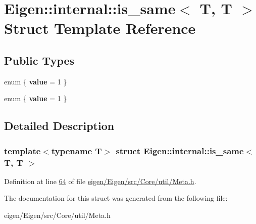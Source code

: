 \hypertarget{struct_eigen_1_1internal_1_1is__same_3_01_t_00_01_t_01_4}{}\section{Eigen\+:\+:internal\+:\+:is\+\_\+same$<$ T, T $>$ Struct Template Reference}
\label{struct_eigen_1_1internal_1_1is__same_3_01_t_00_01_t_01_4}
\subsection*{Public Types}
\begin{DoxyCompactItemize}
\item 
\mbox{\label{struct_eigen_1_1internal_1_1is__same_3_01_t_00_01_t_01_4_a1b9d71b15324a76c6550eccb5c04f9fd}} 
enum \{ {\bfseries value} = 1
 \}
\item 
\mbox{\label{struct_eigen_1_1internal_1_1is__same_3_01_t_00_01_t_01_4_ab45732e21963852ad9bb56799d7aae43}} 
enum \{ {\bfseries value} = 1
 \}
\end{DoxyCompactItemize}


\subsection{Detailed Description}
\subsubsection*{template$<$typename T$>$\newline
struct Eigen\+::internal\+::is\+\_\+same$<$ T, T $>$}



Definition at line \hyperlink{eigen_2_eigen_2src_2_core_2util_2_meta_8h_source_l00064}{64} of file \hyperlink{eigen_2_eigen_2src_2_core_2util_2_meta_8h_source}{eigen/\+Eigen/src/\+Core/util/\+Meta.\+h}.



The documentation for this struct was generated from the following file\+:\begin{DoxyCompactItemize}
\item 
eigen/\+Eigen/src/\+Core/util/\+Meta.\+h\end{DoxyCompactItemize}
